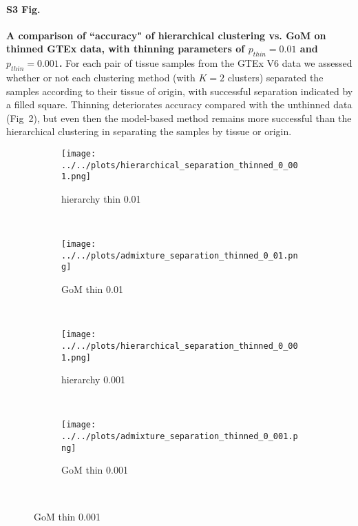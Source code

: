 \documentclass[10pt,letterpaper]{article}
\begin{document}
\paragraph*{S3 Fig.}
\label{figS3}
{\bf A comparison of ``accuracy" of hierarchical clustering vs. GoM on thinned GTEx data, with thinning parameters of $p_{thin}=0.01$ and $p_{thin}=0.001$.}  For each pair of tissue samples from the GTEx V6 data we assessed whether or not each clustering method (with $K=2$ clusters) separated the samples according to their tissue of origin, with successful separation indicated by a filled square. Thinning deteriorates accuracy compared with the unthinned data (Fig~2), but even then the model-based method remains more successful than the hierarchical clustering in separating the samples by tissue or origin.
 \begin{figure}[ht]
    \centering
     \begin{subfigure}[t]{0.5\textwidth}
        \centering
        \texttt{[image: ../../plots/hierarchical\_separation\_thinned\_0\_001.png]}
        \caption{hierarchy thin 0.01}
    \end{subfigure}%
    ~
    \begin{subfigure}[t]{0.5\textwidth}
        \centering
        \texttt{[image: ../../plots/admixture\_separation\_thinned\_0\_01.png]}
        \caption{GoM thin 0.01}
    \end{subfigure}\\

     \begin{subfigure}[t]{0.5\textwidth}
        \centering
        \texttt{[image: ../../plots/hierarchical\_separation\_thinned\_0\_001.png]}
        \caption{hierarchy 0.001}
    \end{subfigure}%
    ~
    \begin{subfigure}[t]{0.5\textwidth}
        \centering
        \texttt{[image: ../../plots/admixture\_separation\_thinned\_0\_001.png]}
        \caption{GoM thin 0.001}
    \end{subfigure}\\
\end{figure}
\end{document}
